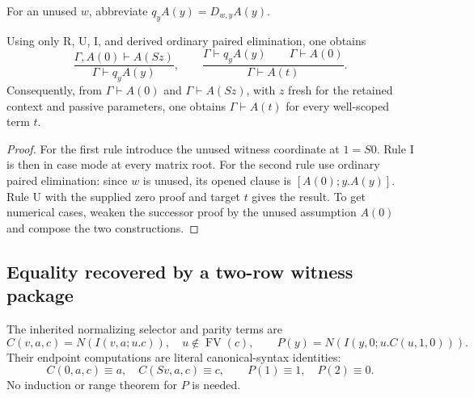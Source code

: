 For an unused $w$, abbreviate $q_yA(y)=D_{w,y}A(y)$.
\begin{lemma}
\label{fus:cases}
Using only R, U, I, and derived ordinary paired elimination, one obtains
\[
 \frac{\Gamma,A(0)\vdash A(Sz)}{\Gamma\vdash q_yA(y)},
 \qquad
 \frac{\Gamma\vdash q_yA(y)\qquad\Gamma\vdash A(0)}
      {\Gamma\vdash A(t)}.
\]
Consequently, from $\Gamma\vdash A(0)$ and $\Gamma\vdash A(Sz)$, with
$z$ fresh for the retained context and passive parameters, one obtains
$\Gamma\vdash A(t)$ for every well-scoped term $t$.
\end{lemma}
\begin{proof}
For the first rule introduce the unused witness coordinate at $1=S0$.
Rule I is then in case mode at every matrix root. For the second rule use
ordinary paired elimination: since $w$ is unused, its opened clause is
$[A(0);y.A(y)]$. Rule U with the supplied zero proof and target $t$ gives
the result. To get numerical cases, weaken the successor proof by the unused
assumption $A(0)$ and compose the two constructions.
\end{proof}

\subsection{Equality recovered by a two-row witness package}

The inherited normalizing selector and parity terms are
\[
 C(v,a,c)=N(I(v,a;u.c)),\quad u\notin\operatorname{FV}(c),
 \qquad
 P(y)=N(I(y,0;u.C(u,1,0))).
\]
Their endpoint computations are literal canonical-syntax identities:
\[
 C(0,a,c)\equiv a,\quad C(Sv,a,c)\equiv c,
 \qquad P(1)\equiv1,\quad P(2)\equiv0.
\]
No induction or range theorem for $P$ is needed.

